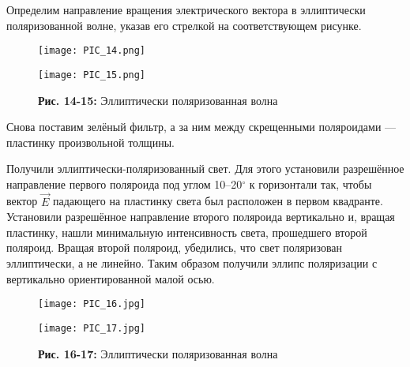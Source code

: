 \documentclass[12pt,a4paper]{scrartcl}
\begin{document}
	Определим направление вращения электрического вектора в эллиптически поляризованной волне, указав его стрелкой на соответствующем рисунке.
	
	 \begin{figure}[h]
		\begin{minipage}{0.5\linewidth}
			\begin{center}
				\texttt{[image: PIC\_14.png]}
			\end{center}
		\end{minipage}
		\begin{minipage}{0.5\linewidth}
			\begin{center}
				\texttt{[image: PIC\_15.png]}
			\end{center}
		\end{minipage}
		\begin{center}
			\textbf{Рис. 14-15:} Эллиптически поляризованная волна
		\end{center}
	\end{figure}

	Снова поставим зелёный фильтр, а за ним между скрещенными поляроидами --- пластинку произвольной толщины.

	Получили эллиптически-поляризованный свет. Для этого установили разрешённое направление первого поляроида под углом 10–20$^\circ$ к горизонтали так, чтобы вектор $\vec{E}$ падающего на пластинку света был расположен в первом квадранте. Установили разрешённое направление второго поляроида вертикально и, вращая пластинку, нашли минимальную интенсивность света, прошедшего второй поляроид. Вращая второй поляроид, убедились, что свет поляризован эллиптически, а не линейно. Таким образом получили эллипс поляризации с вертикально ориентированной малой осью.
	
	\begin{figure}[h]
		\begin{minipage}{0.5\linewidth}
			\begin{center}
				\texttt{[image: PIC\_16.jpg]}
			\end{center}
		\end{minipage}
		\begin{minipage}{0.5\linewidth}
			\begin{center}
				\texttt{[image: PIC\_17.jpg]}
			\end{center}
		\end{minipage}
		\begin{center}
			\textbf{Рис. 16-17:} Эллиптически поляризованная волна
		\end{center}
	\end{figure}
\end{document}
